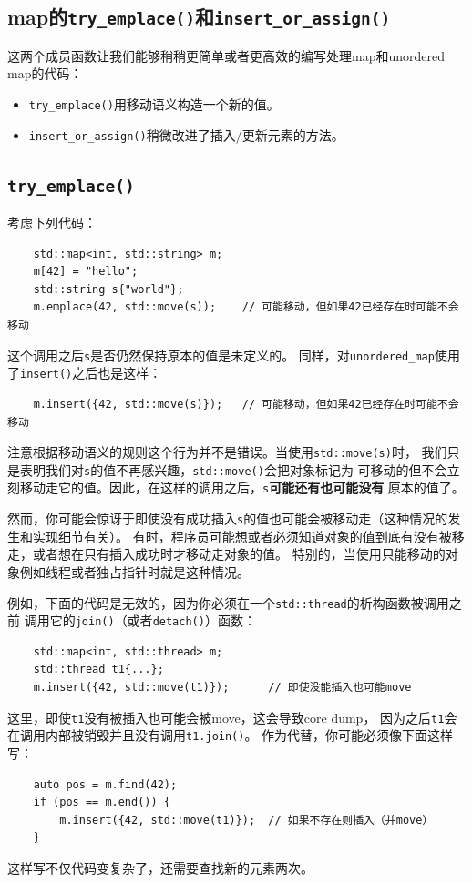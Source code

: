 \subsection{map的\texttt{try\_emplace()}和\texttt{insert\_or\_assign()}}
这两个成员函数让我们能够稍稍更简单或者更高效的编写处理map和unordered map的代码：
\begin{itemize}
    \item \texttt{try\_emplace()}用移动语义构造一个新的值。
    \item \texttt{insert\_or\_assign()}稍微改进了插入/更新元素的方法。
\end{itemize}

\subsection{\texttt{try\_emplace()}}
考虑下列代码：
\begin{lstlisting}
    std::map<int, std::string> m;
    m[42] = "hello";
    std::string s{"world"};
    m.emplace(42, std::move(s));    // 可能移动，但如果42已经存在时可能不会移动
\end{lstlisting}
这个调用之后\texttt{s}是否仍然保持原本的值是未定义的。
同样，对\texttt{unordered\_map}使用了\texttt{insert()}之后也是这样：
\begin{lstlisting}
    m.insert({42, std::move(s)});   // 可能移动，但如果42已经存在时可能不会移动
\end{lstlisting}
注意根据移动语义的规则这个行为并不是错误。当使用\texttt{std::move(s)}时，
我们只是表明我们对\texttt{s}的值不再感兴趣，\texttt{std::move()}会把对象标记为
可移动的但不会立刻移动走它的值。因此，在这样的调用之后，\texttt{s}\textbf{可能还有也可能没有}
原本的值了。

然而，你可能会惊讶于即使没有成功插入\texttt{s}的值也可能会被移动走（这种情况的发生和实现细节有关）。
有时，程序员可能想或者必须知道对象的值到底有没有被移走，或者想在只有插入成功时才移动走对象的值。
特别的，当使用只能移动的对象例如线程或者独占指针时就是这种情况。

例如，下面的代码是无效的，因为你必须在一个\texttt{std::thread}的析构函数被调用之前
调用它的\texttt{join()}（或者\texttt{detach()}）函数：
\begin{lstlisting}
    std::map<int, std::thread> m;
    std::thread t1{...};
    m.insert({42, std::move(t1)});      // 即使没能插入也可能move
\end{lstlisting}
这里，即使\texttt{t1}没有被插入也可能会被move，这会导致core dump，
因为之后\texttt{t1}会在调用内部被销毁并且没有调用\texttt{t1.join()}。
作为代替，你可能必须像下面这样写：
\begin{lstlisting}
    auto pos = m.find(42);
    if (pos == m.end()) {
        m.insert({42, std::move(t1)});  // 如果不存在则插入（并move）
    }
\end{lstlisting}
这样写不仅代码变复杂了，还需要查找新的元素两次。

